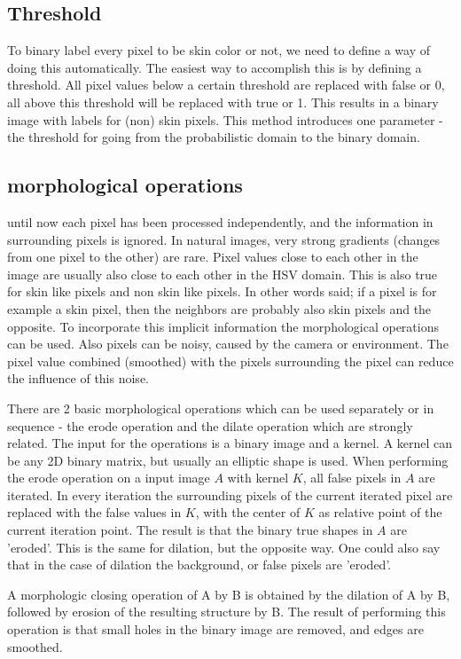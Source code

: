 \subsection*{Threshold}
To binary label every pixel to be skin color or not, we need to define a way of doing this automatically. The easiest way to accomplish this is by defining a threshold. All pixel values below a certain threshold are replaced with false or 0, all above this threshold will be replaced with true or 1. This results in a binary image with labels for (non) skin pixels. This method introduces one parameter - the threshold for going from the probabilistic domain to the binary domain.


\subsection*{morphological operations}
until now each pixel has been processed independently, and the information in surrounding pixels is ignored. In natural images, very strong gradients (changes from one pixel to the other) are rare. Pixel values close to each other in the image are usually also close to each other in the HSV domain. This is also true for skin like pixels and non skin like pixels. In other words said; if a pixel is for example a skin pixel, then the neighbors are probably also skin pixels and the opposite. To incorporate this implicit information the morphological operations can be used. Also pixels can be noisy, caused by the camera or environment. The pixel value combined (smoothed) with the pixels surrounding the pixel can reduce the influence of this noise. 

There are 2 basic morphological operations which can be used separately or in sequence - the erode operation and the dilate operation which are strongly related. The input for the operations is a binary image and a kernel. A kernel can be any 2D binary matrix, but usually an elliptic shape is used. When performing the erode operation on a input image $A$ with kernel $K$, all false pixels in $A$ are iterated. In every iteration the surrounding pixels of the current iterated pixel are replaced with the false values in $K$, with the center of $K$ as relative point of the current iteration point. The result is that the binary true shapes in $A$ are 'eroded'. This is the same for dilation, but the opposite way. One could also say that in the case of dilation the background, or false pixels are 'eroded'.

A morphologic closing operation of A by B is obtained by the dilation of A by B, followed by erosion of the resulting structure by B. The result of performing this operation is that small holes in the binary image are removed, and edges are smoothed.

